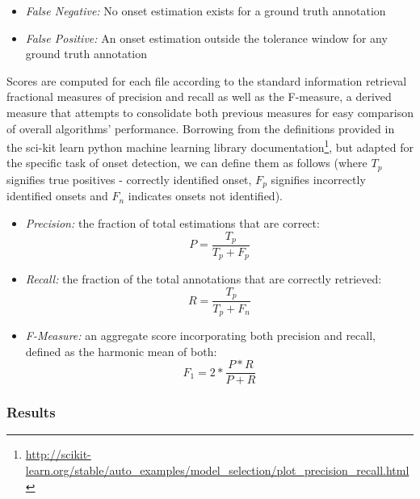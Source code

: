 \begin{itemize}
  \item \textit{False Negative:} No onset estimation exists for a ground truth annotation
  \item \textit{False Positive:} An onset estimation outside the tolerance window for any ground truth annotation
\end{itemize}

Scores are computed for each file according to the standard information retrieval fractional measures of precision and recall as well as the F-measure, a derived measure that attempts to consolidate both previous measures for easy comparison of overall algorithms’ performance. Borrowing from the definitions provided in the sci-kit learn python machine learning library documentation\footnote{\url{http://scikit-learn.org/stable/auto_examples/model_selection/plot_precision_recall.html}}, but adapted for the specific task of onset detection, we can define them as follows (where $T_p$ signifies true positives - correctly identified onset, $F_p$ signifies incorrectly identified onsets and $F_n$ indicates onsets not identified).

\begin{itemize}
  \item \textit{Precision:} the fraction of total estimations that are correct:
\begin{equation}
\label{eq:Precision}	
P=\frac{T_{p}}{T_{p}+F_{p}}
\end{equation}  

  \item \textit{Recall:} the fraction of the total annotations that are correctly retrieved:
\begin{equation}
\label{eq:Precision}	
R=\frac{T_{p}}{T_{p}+F_{n}}
\end{equation}  

  \item \textit{F-Measure:} an aggregate score incorporating both precision and recall, defined as the harmonic mean of both:
\begin{equation}
\label{eq:Precision}	
F_{1}=2*\frac{P*R}{P+R}
\end{equation}  

\end{itemize}

\subsubsection{Results}

